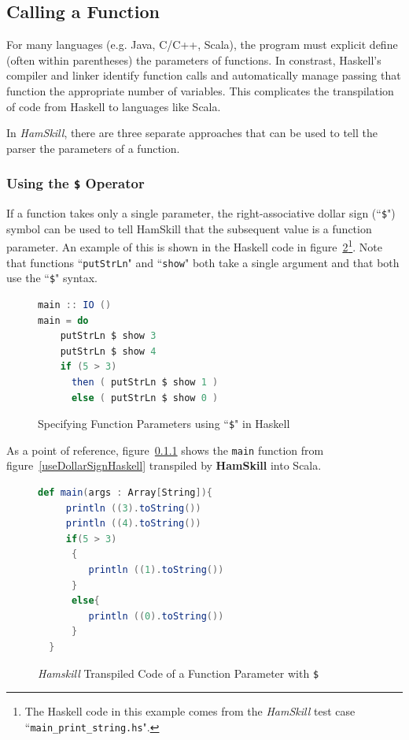\documentclass{report}
\begin{document}
\subsection{Calling a Function}\label{sec:callingAFunction}

For many languages (e.g. Java, C/C++, Scala), the program must explicit define (often within parentheses) the parameters of functions.  In constrast, Haskell's compiler and linker identify function calls and automatically manage passing that function the appropriate number of variables.  This complicates the transpilation of code from Haskell to languages like Scala.

In \textit{HamSkill}, there are three separate approaches that can be used to tell the parser the parameters of a function.

\subsubsection{Using the \texttt{\$} Operator}

If a function takes only a single parameter, the right-associative dollar sign (``\texttt{\$}") symbol can be used to tell HamSkill that the subsequent value is a function parameter.  An example of this is shown in the Haskell code in figure~\ref{fig:useDollarSignHaskell}\footnote{The Haskell code in this example comes from the \textit{HamSkill} test case ``\texttt{main\_print\_string.hs}".}.  Note that functions ``\texttt{putStrLn}" and ``\texttt{show}" both take a single argument and that both use the ``\texttt{\$}" syntax.

\begin{figure}[H]
\begin{mdframed}
\begin{lstlisting}[basicstyle=\small, language=scala]
main :: IO ()
main = do
    putStrLn $ show 3 
    putStrLn $ show 4
    if (5 > 3) 
      then ( putStrLn $ show 1 ) 
      else ( putStrLn $ show 0 )
\end{lstlisting}
\end{mdframed}
\caption{Specifying Function Parameters using ``\texttt{\$}" in Haskell}\label{fig:useDollarSignHaskell}
\end{figure}

As a point of reference, figure~\ref{} shows the \texttt{main} function from figure~\ref{useDollarSignHaskell} transpiled by \textbf{HamSkill} into Scala.

\begin{figure}[H]
\begin{mdframed}
\begin{lstlisting}[basicstyle=\small, language=scala]
  def main(args : Array[String]){
     println ((3).toString())
     println ((4).toString())
     if(5 > 3)
      {
         println ((1).toString())
      }
      else{
         println ((0).toString())
      }
  } 
\end{lstlisting}
\end{mdframed}
\caption{\textit{Hamskill} Transpiled Code of a Function Parameter with \texttt{\$}}\label{fig:useDollarSignHaskell}
\end{figure}
\end{document}
